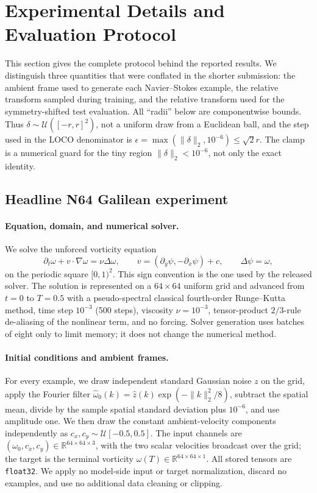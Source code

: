 \section{Experimental Details and Evaluation Protocol}
\label{sec:experimental-details}

This section gives the complete protocol behind the reported results.  We distinguish
three quantities that were conflated in the shorter submission: the ambient frame
used to generate each Navier--Stokes example, the relative transform sampled during
training, and the relative transform used for the symmetry-shifted test evaluation.
All ``radii'' below are componentwise bounds.  Thus
\(\delta\sim\mathcal U([-r,r]^2)\), not a uniform draw from a Euclidean ball, and
the step used in the LOCO denominator is
\(\epsilon=\max(\lVert\delta\rVert_2,10^{-6})\leq\sqrt{2}r\).  The clamp is
a numerical guard for the tiny region \(\lVert\delta\rVert_2<10^{-6}\), not only
the exact identity.

\subsection{Headline N64 Galilean experiment}

\paragraph{Equation, domain, and numerical solver.}
We solve the unforced vorticity equation
\begin{equation}
  \partial_t\omega + v\mathbin{\cdot}\nabla\omega
  = \nu\Delta\omega,
  \qquad
  v=(\partial_y\psi,-\partial_x\psi)+c,
  \qquad
  \Delta\psi=\omega,
\end{equation}
on the periodic square \([0,1)^2\).  This sign convention is the one used by the
released solver.  The solution is represented on a \(64\times64\) uniform grid and
advanced from \(t=0\) to \(T=0.5\) with a pseudo-spectral classical fourth-order
Runge--Kutta method, time step \(10^{-3}\) (500 steps), viscosity
\(\nu=10^{-3}\), tensor-product \(2/3\)-rule de-aliasing of the nonlinear term,
and no forcing.  Solver generation uses batches of eight only to limit memory; it
does not change the numerical method.

\paragraph{Initial conditions and ambient frames.}
For every example, we draw independent standard Gaussian noise \(z\) on the grid,
apply the Fourier filter
\(\widehat\omega_0(k)=\widehat z(k)\exp(-\lVert k\rVert_2^2/8)\), subtract the
spatial mean, divide by the sample spatial standard deviation plus \(10^{-6}\),
and use amplitude one.  We then draw the constant ambient-velocity components
independently as \(c_x,c_y\sim\mathcal U[-0.5,0.5]\).  The input channels are
\((\omega_0,c_x,c_y)\in\mathbb R^{64\times64\times3}\), with the two scalar
velocities broadcast over the grid; the target is the terminal vorticity
\(\omega(T)\in\mathbb R^{64\times64\times1}\).  All stored tensors are
\texttt{float32}.  We apply no model-side input or target normalization, discard no
examples, and use no additional data cleaning or clipping.

